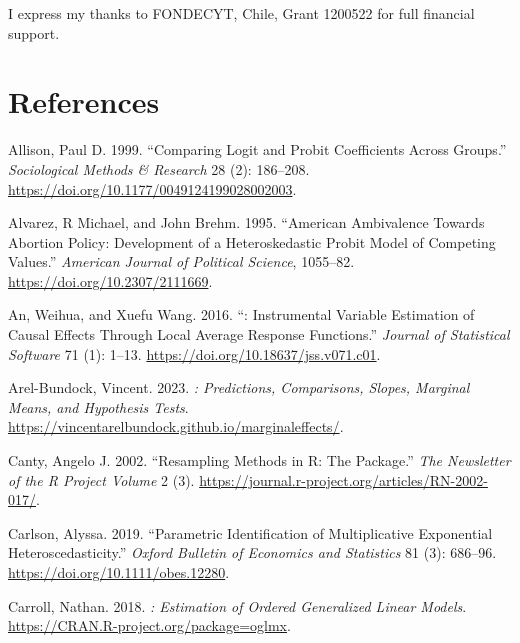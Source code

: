 I express my thanks to FONDECYT, Chile, Grant 1200522 for full financial support.

\hypertarget{references}{%
\section*{References}\label{references}}

\hypertarget{refs}{}
\begin{CSLReferences}{1}{0}
\leavevmode{}%
Allison, Paul D. 1999. {``{Comparing Logit and Probit Coefficients Across Groups}.''} \emph{Sociological Methods \& Research} 28 (2): 186--208. \url{https://doi.org/10.1177/0049124199028002003}.

\leavevmode{}%
Alvarez, R Michael, and John Brehm. 1995. {``{American Ambivalence Towards Abortion Policy: Development of a Heteroskedastic Probit Model of Competing Values}.''} \emph{American Journal of Political Science}, 1055--82. \url{https://doi.org/10.2307/2111669}.

\leavevmode{}%
An, Weihua, and Xuefu Wang. 2016. {``: Instrumental Variable Estimation of Causal Effects Through Local Average Response Functions.''} \emph{Journal of Statistical Software} 71 (1): 1--13. \url{https://doi.org/10.18637/jss.v071.c01}.

\leavevmode{}%
Arel-Bundock, Vincent. 2023. \emph{: Predictions, Comparisons, Slopes, Marginal Means, and Hypothesis Tests}. \url{https://vincentarelbundock.github.io/marginaleffects/}.

\leavevmode{}%
Canty, Angelo J. 2002. {``{Resampling Methods in R: The  Package}.''} \emph{The Newsletter of the R Project Volume} 2 (3). \url{https://journal.r-project.org/articles/RN-2002-017/}.

\leavevmode{}%
Carlson, Alyssa. 2019. {``{Parametric Identification of Multiplicative Exponential Heteroscedasticity}.''} \emph{Oxford Bulletin of Economics and Statistics} 81 (3): 686--96. \url{https://doi.org/10.1111/obes.12280}.

\leavevmode{}%
Carroll, Nathan. 2018. \emph{: Estimation of Ordered Generalized Linear Models}. \url{https://CRAN.R-project.org/package=oglmx}.


\end{CSLReferences}
